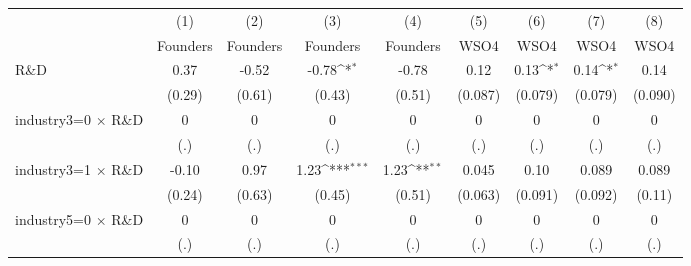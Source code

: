 {
\def\sym#1{\ifmmode^{#1}\else\(^{#1}\)\fi}
\begin{tabular}{l*{8}{c}}
\toprule
                    &\multicolumn{1}{c}{(1)}&\multicolumn{1}{c}{(2)}&\multicolumn{1}{c}{(3)}&\multicolumn{1}{c}{(4)}&\multicolumn{1}{c}{(5)}&\multicolumn{1}{c}{(6)}&\multicolumn{1}{c}{(7)}&\multicolumn{1}{c}{(8)}\\
                    &\multicolumn{1}{c}{Founders}&\multicolumn{1}{c}{Founders}&\multicolumn{1}{c}{Founders}&\multicolumn{1}{c}{Founders}&\multicolumn{1}{c}{WSO4}&\multicolumn{1}{c}{WSO4}&\multicolumn{1}{c}{WSO4}&\multicolumn{1}{c}{WSO4}\\
\midrule
R\&D                &        0.37         &       -0.52         &       -0.78\sym{*}  &       -0.78         &        0.12         &        0.13\sym{*}  &        0.14\sym{*}  &        0.14         \\
                    &      (0.29)         &      (0.61)         &      (0.43)         &      (0.51)         &     (0.087)         &     (0.079)         &     (0.079)         &     (0.090)         \\
\addlinespace
industry3=0 $\times$ R\&D&           0         &           0         &           0         &           0         &           0         &           0         &           0         &           0         \\
                    &         (.)         &         (.)         &         (.)         &         (.)         &         (.)         &         (.)         &         (.)         &         (.)         \\
\addlinespace
industry3=1 $\times$ R\&D&       -0.10         &        0.97         &        1.23\sym{***}&        1.23\sym{**} &       0.045         &        0.10         &       0.089         &       0.089         \\
                    &      (0.24)         &      (0.63)         &      (0.45)         &      (0.51)         &     (0.063)         &     (0.091)         &     (0.092)         &      (0.11)         \\
\addlinespace
industry5=0 $\times$ R\&D&           0         &           0         &           0         &           0         &           0         &           0         &           0         &           0         \\
                    &         (.)         &         (.)         &         (.)         &         (.)         &         (.)         &         (.)         &         (.)         &         (.)         \\

\end{tabular}}
